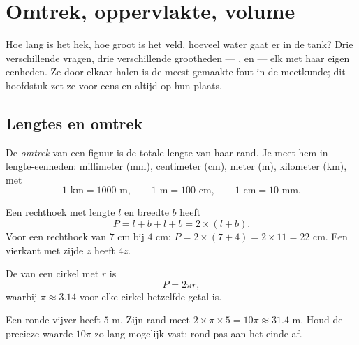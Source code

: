 \chapter{Omtrek, oppervlakte, volume}\label{ch:g6:measure}

Hoe lang is het hek, hoe groot is het veld, hoeveel water gaat er in de tank?
Drie verschillende vragen, drie verschillende grootheden --- , 
en  --- elk met haar eigen eenheden. Ze door elkaar halen is de meest
gemaakte fout in de meetkunde; dit hoofdstuk zet ze voor eens en altijd op hun
plaats.

\section{Lengtes en omtrek}

\begin{definition}[Omtrek]\label{def:g6:measure:perimeter}
De \emph{omtrek} van een figuur is de totale lengte van haar
rand. Je meet hem in lengte-eenheden: millimeter (mm), centimeter (cm), meter
(m), kilometer (km), met
\[
1 \text{ km} = 1000 \text{ m}, \qquad
1 \text{ m} = 100 \text{ cm}, \qquad
1 \text{ cm} = 10 \text{ mm}.
\]
\end{definition}

\begin{example}\label{ex:g6:measure:perimeter}
Een rechthoek met lengte $l$ en breedte $b$ heeft 
\[
P = l + b + l + b = 2 \times (l + b).
\]
Voor een rechthoek van $7$ cm bij $4$ cm: $P = 2 \times (7 + 4) = 2 \times 11 =
22$ cm. Een vierkant met zijde $z$ heeft  $4z$.
\end{example}

\begin{proposition}\label{prop:g6:measure:circle}
De  van een cirkel met  $r$ is
\[
P = 2 \pi r ,
\]
waarbij $\pi \approx 3.14$ voor elke cirkel hetzelfde getal is.
\end{proposition}
\admitted

\begin{example}
Een ronde vijver heeft  $5$ m. Zijn rand meet
$2 \times \pi \times 5 = 10\pi \approx 31.4$ m. Houd de precieze waarde
$10\pi$ zo lang mogelijk vast; rond pas aan het einde af.
\end{example}

